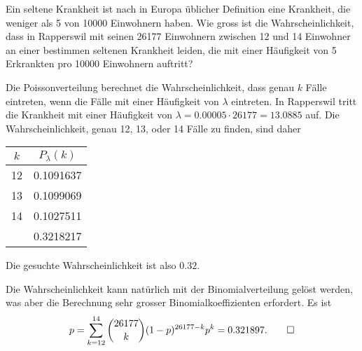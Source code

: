 Ein seltene Krankheit ist nach in Europa üblicher Definition eine
Krankheit, die weniger als 5 von 10000 Einwohnern haben. Wie gross
ist die Wahrscheinlichkeit, dass in Rapperswil mit seinen 26177
Einwohnern zwischen 12 und 14 Einwohner an einer bestimmen
seltenen Krankheit leiden, die mit einer Häufigkeit von 5 Erkrankten
pro 10000 Einwohnern auftritt?


\begin{loesung}
Die Poissonverteilung berechnet die Wahrscheinlichkeit, dass genau
$k$ Fälle eintreten, wenn die Fälle mit einer Häufigkeit
von $\lambda$ eintreten. In Rapperswil tritt die Krankheit mit
einer Häufigkeit von $\lambda=0.00005 \cdot 26177=13.0885$ auf.
Die Wahrscheinlichkeit, genau 12, 13, oder 14 Fälle zu finden, sind
daher
\begin{center}
\begin{tabular}{|c|c|}
\hline
$k$&$P_\lambda(k)$\\
\hline
12&0.1091637\\
13&0.1099069\\
14&0.1027511\\
\hline
  &0.3218217\\
\hline
\end{tabular}
\end{center}
Die gesuchte Wahrscheinlichkeit ist also $0.32$.

Die Wahrscheinlichkeit kann natürlich mit der Binomialverteilung
gelöst werden, was aber die Berechnung sehr grosser Binomialkoeffizienten
erfordert. Es ist
\[
p=\sum_{k=12}^{14}\binom{26177}{k}(1-p)^{26177-k}p^k=0.321897.
\qedhere
\]
\end{loesung}

